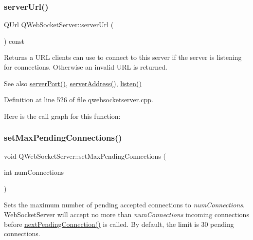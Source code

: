 \subsubsection{\texorpdfstring{server\+Url()}{serverUrl()}}
{\footnotesize\ttfamily Q\+Url Q\+Web\+Socket\+Server\+::server\+Url (\begin{DoxyParamCaption}{ }\end{DoxyParamCaption}) const}

Returns a U\+RL clients can use to connect to this server if the server is listening for connections. Otherwise an invalid U\+RL is returned.

\begin{DoxySeeAlso}{See also}
\mbox{\hyperlink{class_q_web_socket_server_aafc6ff4b146c2b049df45922a2d9be7e}{server\+Port()}}, \mbox{\hyperlink{class_q_web_socket_server_a8c9df0e8ad799e0ea633db852f37497a}{server\+Address()}}, \mbox{\hyperlink{class_q_web_socket_server_a3859403d15dbb2b487a3990d68660841}{listen()}} 
\end{DoxySeeAlso}


Definition at line 526 of file qwebsocketserver.\+cpp.

Here is the call graph for this function\+:
\mbox{\label{class_q_web_socket_server_acc258d1094c0a0392c1e436bbff9c04a}} 
\subsubsection{\texorpdfstring{set\+Max\+Pending\+Connections()}{setMaxPendingConnections()}}
{\footnotesize\ttfamily void Q\+Web\+Socket\+Server\+::set\+Max\+Pending\+Connections (\begin{DoxyParamCaption}\item[{int}]{num\+Connections }\end{DoxyParamCaption})}

Sets the maximum number of pending accepted connections to {\itshape num\+Connections}. Web\+Socket\+Server will accept no more than {\itshape num\+Connections} incoming connections before \mbox{\hyperlink{class_q_web_socket_server_ad2463f7d2f2576268d193186ee516c94}{next\+Pending\+Connection()}} is called. By default, the limit is 30 pending connections.

